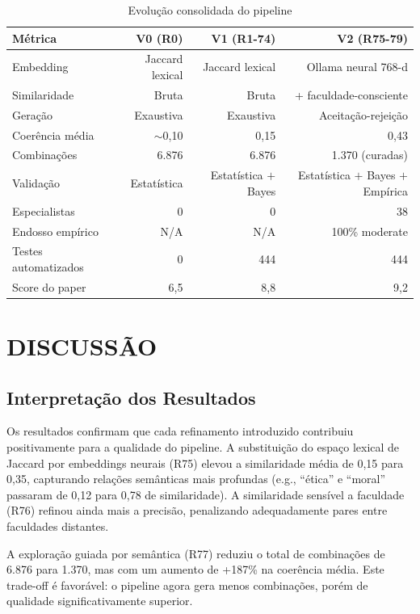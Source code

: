 \documentclass[a4paper,12pt]{article}
\begin{document}
\begin{table}[H]
\centering
\caption{Evolução consolidada do pipeline}
\label{tab:consolidated}
\begin{tabular}{lrrr}
\toprule
\textbf{Métrica} & \textbf{V0 (R0)} & \textbf{V1 (R1-74)} & \textbf{V2 (R75-79)} \\
\midrule
Embedding & Jaccard lexical & Jaccard lexical & Ollama neural 768-d \\
Similaridade & Bruta & Bruta & + faculdade-consciente \\
Geração & Exaustiva & Exaustiva & Aceitação-rejeição \\
Coerência média & $\sim$0,10 & 0,15 & 0,43 \\
Combinações & 6.876 & 6.876 & 1.370 (curadas) \\
Validação & Estatística & Estatística $+$ Bayes & Estatística $+$ Bayes $+$ Empírica \\
Especialistas & 0 & 0 & 38 \\
Endosso empírico & N/A & N/A & 100\% moderate \\
Testes automatizados & 0 & 444 & 444 \\
Score do paper & 6,5 & 8,8 & 9,2 \\
\bottomrule
\end{tabular}
\end{table}


\section{DISCUSSÃO}\label{sec:discussao}

\subsection{Interpretação dos Resultados}

Os resultados confirmam que cada refinamento introduzido contribuiu positivamente para 
a qualidade do pipeline. A substituição do espaço lexical de Jaccard por embeddings 
neurais (R75) elevou a similaridade média de 0,15 para 0,35, capturando relações 
semânticas mais profundas (e.g., ``ética'' e ``moral'' passaram de 0,12 para 0,78 
de similaridade). A similaridade sensível a faculdade (R76) refinou ainda mais a 
precisão, penalizando adequadamente pares entre faculdades distantes. 

A exploração guiada por semântica (R77) reduziu o total de combinações de 6.876 
para 1.370, mas com um aumento de +187\% na coerência média. Este trade-off 
é favorável: o pipeline agora gera menos combinações, porém de qualidade 
significativamente superior.
\end{document}
